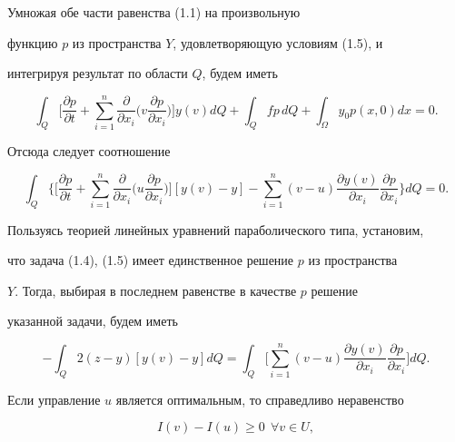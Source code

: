 \begin{pf} 


Умножая обе части равенства (1.1) на произвольную 


функцию $p$ из пространства $Y$, удовлетворяющую условиям (1.5), и 


интегрируя результат по области $Q$, будем иметь 


$$ 


\int_Q\bigg[\frac{\partial p}{\partial t}+\sum^n_{i=1} 


\frac{\partial }{\partial x_i}\bigg(v 


\frac{\partial p}{\partial x_i}\bigg)\bigg]y(v)d Q+ 


\int_Q f p\,d Q+\int_\Omega y_0p(x,0)d x=0. 


$$ 


Отсюда следует соотношение 


$$ 


\int_Q\bigg\{\bigg[\frac{\partial p}{\partial t} 


+\sum^n_{i=1}\frac{\partial }{\partial x_i}\bigg(u 


\frac{\partial p}{\partial x_i}\bigg)\bigg][y(v)-y]-\sum^n_{i=1} 


(v-u)\frac{\partial y(v)}{\partial x_i} 


\frac{\partial p}{\partial x_i}\bigg\}d Q=0. 


$$ 


Пользуясь теорией линейных уравнений параболического типа, установим, 


что задача (1.4), (1.5) имеет единственное решение $p$ из пространства 


$Y$. Тогда, выбирая в последнем равенстве в качестве $p$ решение 


указанной задачи, будем иметь 


\begin{equation} 


-\int_Q 2(z-y)[y(v)-y]d Q=\int_Q\bigg[\sum^n_{i=1}(v-u) 


\frac{\partial y(v)}{\partial x_i} 


\frac{\partial p}{\partial x_i}\bigg]d Q. 


\end{equation} 


Если управление $u$ является оптимальным, то справедливо неравенство 


$$ 


I(v)-I(u)\ge0\ \ \forall v\in U, 


$$ 



\end{pf}
